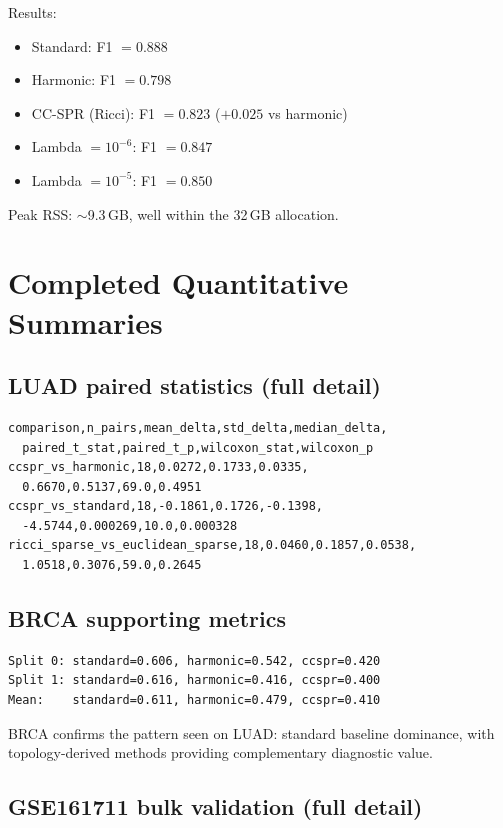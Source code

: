 \documentclass[11pt]{article}
\begin{document}
Results:
\begin{itemize}[leftmargin=1.5em]
\item Standard: F1 $= 0.888$
\item Harmonic: F1 $= 0.798$
\item CC-SPR (Ricci): F1 $= 0.823$ ($+0.025$ vs harmonic)
\item Lambda $= 10^{-6}$: F1 $= 0.847$
\item Lambda $= 10^{-5}$: F1 $= 0.850$
\end{itemize}
Peak RSS: ${\sim}$9.3\,GB, well within the 32\,GB allocation.

\section{Completed Quantitative Summaries}
\label{sec:quant}

\subsection{LUAD paired statistics (full detail)}

\begin{verbatim}
comparison,n_pairs,mean_delta,std_delta,median_delta,
  paired_t_stat,paired_t_p,wilcoxon_stat,wilcoxon_p
ccspr_vs_harmonic,18,0.0272,0.1733,0.0335,
  0.6670,0.5137,69.0,0.4951
ccspr_vs_standard,18,-0.1861,0.1726,-0.1398,
  -4.5744,0.000269,10.0,0.000328
ricci_sparse_vs_euclidean_sparse,18,0.0460,0.1857,0.0538,
  1.0518,0.3076,59.0,0.2645
\end{verbatim}

\subsection{BRCA supporting metrics}
\begin{verbatim}
Split 0: standard=0.606, harmonic=0.542, ccspr=0.420
Split 1: standard=0.616, harmonic=0.416, ccspr=0.400
Mean:    standard=0.611, harmonic=0.479, ccspr=0.410
\end{verbatim}
BRCA confirms the pattern seen on LUAD: standard baseline dominance, with topology-derived methods providing complementary diagnostic value.

\subsection{GSE161711 bulk validation (full detail)}
\end{document}
